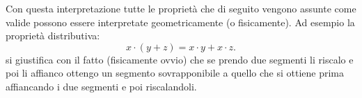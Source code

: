 Con questa interpretazione tutte le proprietà che di seguito vengono assunte come
valide possono essere interpretate geometricamente (o fisicamente).
Ad esempio la proprietà distributiva:
\[
  x \cdot (y +z) = x \cdot y + x \cdot z.
\]
si giustifica con il fatto (fisicamente ovvio) che se prendo due segmenti
li riscalo e poi li affianco ottengo un segmento sovrapponibile a quello che
si ottiene prima affiancando i due segmenti e poi riscalandoli.

\begin{comment}

\begin{definition}[gruppo]
Un insieme $X$ su cui è definita una \emph{operazione}\footnote{%
una operazione su $X$ è una funzione $f\colon X\times X \to X$ per la quale
si usa la notazione infissa: $x*y = f(x,y)$.}
$*$ si dice essere un \myemph{gruppo} se l'operazione
ha le seguenti proprietà:
\begin{enumerate}
  \item associativa: $\forall x,y,z\in X\colon (x*y)*z = x*(y*z)$;
  \item esistenza elemento neutro: $\exists e\in X\colon \forall x\in X \colon e*x=x*e = x$;
  \item esistenza inverso: $\forall x\in X\colon \exists y\in X\colon x*y=y*x=e$.
\end{enumerate}
Inoltre il gruppo si dice essere \myemph[gruppo!abeliano]{abeliano} o \emph{commutativo}
se vale la proprietà:
\begin{enumerate}
  \item[4.] commutativa: $\forall x,y\in X\colon x*y = y*x$.
\end{enumerate}
\end{definition}

\begin{definition}[relazione d'ordine]
Una relazione\footnote{%
Una relazione $R$ su un insieme $X$ è un sottoinsieme
dell'insieme $X\times X$ per cui si usa la notazione infissa:
$xRy$ per indicare $(x,y)\in R$}
$\le$ su un insieme $X$ viene detta
\myemph{relazione d'ordine}
se soddisfa le seguenti proprietà (per ogni $x,y,z\in X$):
\begin{enumerate}
  \item[1.] riflessiva: $x\le x$;
  \item[2.] antisimmetrica: $x\le y \land y\le x \implies x=y$;
  \item[3.] transitiva: $x\le y \land y\le z \implies x\le z$.
\end{enumerate}
Si dice inoltre che la relazione d'ordine $\le$
è una \myemph{relazione d'ordine totale} se vale
\begin{enumerate}
  \item[4.] dicotomia: $x\le y \lor y\le x$.
\end{enumerate}


\end{comment}
